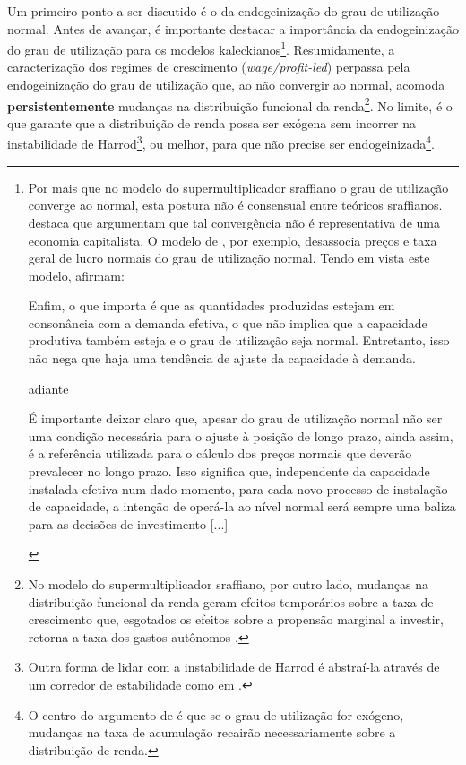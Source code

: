 Um primeiro ponto a ser discutido é o da endogeinização do grau de utilização normal.
Antes de avançar, é importante destacar a importância da endogeinização do grau de utilização para os modelos kaleckianos\footnote{
	Por mais que no modelo do supermultiplicador sraffiano o grau de utilização converge ao normal, esta postura não é consensual entre teóricos sraffianos. \textcite[p.~161]{cesaratto_neo-kaleckian_2015} destaca que \textcites{garegnani_notes_1992}{palumbo_growth_2003} argumentam que tal convergência não é representativa de uma economia capitalista. O modelo de \textcite[Orignial de 1986]{ciccone_2017}, por exemplo, desassocia preços e taxa geral de lucro normais do grau de utilização normal. Tendo em vista este modelo, \textcite[p.~476]{moreira_demanda_2018} afirmam:
	
	\begin{citacao}
		Enfim, o que importa é que as
		quantidades produzidas estejam em consonância com a demanda efetiva, o que não
		implica que a capacidade produtiva também esteja e o grau de utilização seja normal.
		Entretanto, isso não nega que haja uma tendência de ajuste da capacidade à demanda.
	\end{citacao}
	adiante
	\begin{citacao}
		É importante deixar claro que, apesar do grau de utilização normal não ser
		uma condição necessária para o ajuste à posição de longo prazo, ainda assim, é a
		referência utilizada para o cálculo dos preços normais que deverão prevalecer no
		longo prazo. Isso significa que, independente da capacidade instalada efetiva num
		dado momento, para cada novo processo de instalação de capacidade, a intenção de
		operá-la ao nível normal será sempre uma baliza para as decisões de investimento [...]
		\cite[p.~477]{moreira_demanda_2018}
	\end{citacao}}.
Resumidamente, a caracterização dos regimes de crescimento (\textit{wage/profit-led}) perpassa pela endogeinização do grau de utilização que, ao não convergir ao normal, acomoda  \textbf{persistentemente} mudanças na distribuição funcional da renda\footnote{
	No modelo do supermultiplicador sraffiano, por outro lado, mudanças na distribuição funcional da renda geram efeitos temporários sobre a taxa de crescimento que, esgotados os efeitos sobre a propensão marginal a investir, retorna a taxa dos gastos autônomos \cite[p.~ 79]{serrano_sraffian_2017}.
}.  
No limite, é o que garante que a distribuição de renda possa ser exógena sem incorrer na instabilidade de Harrod\footnote{
	Outra forma de lidar com a instabilidade de Harrod é abstraí-la através de um corredor de estabilidade como em \textcites{dutt_growth_1990}{setterfield_long-run_2017}.
}, ou melhor, para que não precise ser endogeinizada\footnote{
	O centro do argumento de \textcite[p.~155--160]{amadeo_role_1986} é que se o grau de utilização for exógeno, mudanças na taxa de acumulação recairão necessariamente sobre a distribuição de renda.
}.
